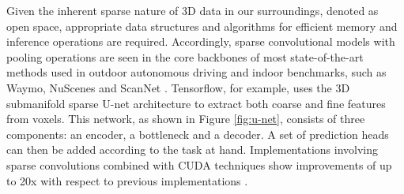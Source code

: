 Given the inherent sparse nature of 3D data in our surroundings, denoted as open space, appropriate data structures and algorithms for efficient memory and inference operations are required. Accordingly, sparse convolutional models with pooling operations are seen in the core backbones of most state-of-the-art methods used in outdoor autonomous driving and indoor benchmarks, such as Waymo, NuScenes and ScanNet \cite{najibi2020dops}.
Tensorflow, for example, uses the 3D submanifold sparse U-net architecture to extract both coarse and fine features from voxels. This network, as shown in Figure \ref{fig:u-net}, consists of three components: an encoder, a bottleneck and a decoder. A set of prediction heads can then be added according to the task at hand. Implementations involving sparse convolutions combined with CUDA techniques show improvements of up to 20x with respect to previous implementations \cite{najibi2020dops}.







